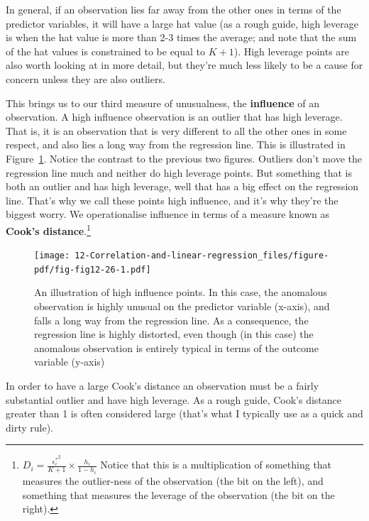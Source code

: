 \documentclass[
  a4paper,
]{book}
\begin{document}
In general, if an observation lies far away from the other ones in terms
of the predictor variables, it will have a large hat value (as a rough
guide, high leverage is when the hat value is more than 2-3 times the
average; and note that the sum of the hat values is constrained to be
equal to \(K + 1\)). High leverage points are also worth looking at in
more detail, but they're much less likely to be a cause for concern
unless they are also outliers.

This brings us to our third measure of unusualness, the
\textbf{influence} of an observation. A high influence observation is an
outlier that has high leverage. That is, it is an observation that is
very different to all the other ones in some respect, and also lies a
long way from the regression line. This is illustrated in
Figure~\ref{fig-fig12-26}. Notice the contrast to the previous two
figures. Outliers don't move the regression line much and neither do
high leverage points. But something that is both an outlier and has high
leverage, well that has a big effect on the regression line. That's why
we call these points high influence, and it's why they're the biggest
worry. We operationalise influence in terms of a measure known as
\textbf{Cook's distance}.\footnote{\(D_i=\frac{{\epsilon_i^*}^2}{K+1} \times \frac{h_i}{1-h_i}\)
  Notice that this is a multiplication of something that measures the
  outlier-ness of the observation (the bit on the left), and something
  that measures the leverage of the observation (the bit on the right).}

\begin{figure}[h!]

\texttt{[image: 12-Correlation-and-linear-regression\_files/figure-pdf/fig-fig12-26-1.pdf]} \hfill{}

\caption{\label{fig-fig12-26}An illustration of high influence points.
In this case, the anomalous observation is highly unusual on the
predictor variable (x-axis), and falls a long way from the regression
line. As a consequence, the regression line is highly distorted, even
though (in this case) the anomalous observation is entirely typical in
terms of the outcome variable (y-axis)}

\end{figure}

In order to have a large Cook's distance an observation must be a fairly
substantial outlier and have high leverage. As a rough guide, Cook's
distance greater than 1 is often considered large (that's what I
typically use as a quick and dirty rule).
\end{document}
